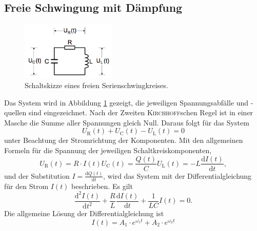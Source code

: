 \subsection{Freie Schwingung mit Dämpfung}
\label{sec:theorie1}
\begin{figure}[h]
	\centering
	\includegraphics[width=0.4\textwidth]{Bilder/Maschenfoto1.png}
	\caption{Schaltskizze eines freien Serienschwingkreises. \cite{v354}}
	\label{fig:schaltkreis_rein}
\end{figure}
Das System wird in Abbildung \ref{fig:schaltkreis_rein} gezeigt, die jeweiligen Spannungsabfälle und -quellen sind eingezeichnet.
Nach der Zweiten \textsc{Kirchhoff}schen Regel ist in einer Masche die Summe aller Spannungen gleich Null. 
Daraus folgt für das System
\begin{equation}
	U_\text{R}(t)+U_\text{C}(t)-U_\text{L}(t)=0
\end{equation}
unter Beachtung der Stromrichtung der Komponenten.
Mit den allgemeinen Formeln für die Spannung der jeweiligen Schaltkreiskomponenten,
\begin{subequations}
\begin{equation}
		U_\text{R}(t) = R\cdot I(t)
\end{equation}
\begin{equation}
		U_\text{C}(t) = \frac{Q(t)}{C}
\end{equation}
\begin{equation}
		U_\text{L}(t) = -L\frac{\mathup{d}I(t)}{\mathup{d}t},
\end{equation}
\label{eq:austauscher}
\end{subequations}
und der Substitution
$I=\frac{\mathup{d}Q(t)}{\mathup{d}t}$,
wird das System mit der Differentialgleichung für den Strom $I(t)$ beschrieben.
Es gilt
\begin{equation}
	\frac{\mathup{d^2}I(t)}{\mathup{d}t^2}+\frac{{R}}{{L}}\frac{\mathup{d}I(t)}{\mathup{d}t}+\frac{1}{{LC}}I(t)=0.
\end{equation}
Die allgemeine Lösung der Differentialgleichung ist
\begin{equation}
	I(t) = A_1\cdot e^{{\omega_1}t} +A_2\cdot e^{{\omega_2}t}
	\label{eq:allgloesung}
\end{equation}

